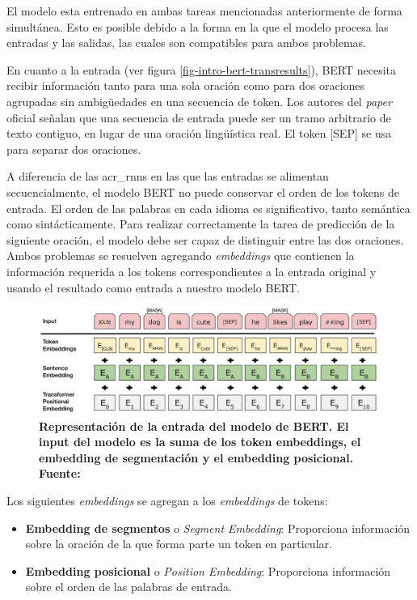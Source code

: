 El modelo esta entrenado en ambas tareas mencionadas anteriormente de forma simultánea. Esto es posible debido a la forma en la que el modelo procesa las entradas y las salidas, las cuales son compatibles para ambos problemas. 

En cuanto a la entrada (ver figura \ref{fig-intro-bert-transresults}), BERT necesita recibir información tanto para una sola oración como para dos oraciones agrupadas sin ambigüedades en una secuencia de token. Los autores del \textit{paper} oficial señalan que una secuencia de entrada puede ser un tramo arbitrario de texto contiguo, en lugar de una oración lingüística real. El token [SEP] se usa para separar dos oraciones.

A diferencia de las \acrshort{acr_rnn}s en las que las entradas se alimentan secuencialmente, el modelo BERT no puede conservar el orden de los tokens de entrada. El orden de las palabras en cada idioma es significativo, tanto semántica como sintácticamente. Para realizar correctamente la tarea de predicción de la siguiente oración, el modelo debe ser capaz de distinguir entre las dos oraciones. Ambos problemas se resuelven agregando \textit{embeddings} que contienen la información requerida a los tokens correspondientes a la entrada original y usando el resultado como entrada a nuestro modelo BERT. 

\begin{figure}[ht!]
    \centering
    \includegraphics[scale=0.3]{figuras/intro-bert-tokens.png}
    \caption[BERT - Token Embeddings]{\textbf{Representación de la entrada del modelo de BERT. El input del modelo es la suma de los token embeddings, el embedding de segmentación y el embedding posicional. Fuente: \cite{https://doi.org/10.48550/arxiv.1706.03762}}}
    \label{fig-intro-bert-tokens}
\end{figure}

Los siguientes \textit{embeddings} se agregan a los \textit{embeddings} de tokens:

\begin{itemize}
    \item \textbf{Embedding de segmentos} o \textit{Segment Embedding}: Proporciona información sobre la oración de la que forma parte un token en particular.
    \item  \textbf{Embedding posicional} o \textit{Position Embedding}: Proporciona información sobre el orden de las palabras de entrada.
\end{itemize}

